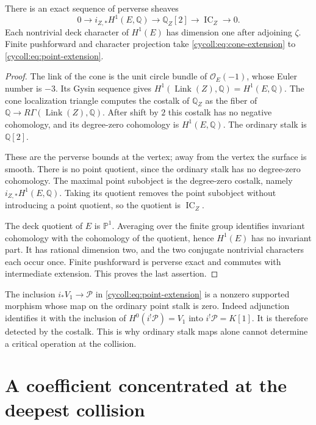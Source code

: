 \begin{proposition}\label{cycoll:prop:cone}
There is an exact sequence of perverse sheaves
\begin{equation}\label{cycoll:eq:cone-extension}
 0\longrightarrow i_{Z,*}H^1(E,\mathbb Q)
       \longrightarrow\mathbb Q_Z[2]
       \longrightarrow\operatorname{IC}_Z\longrightarrow0.
\end{equation}
Each nontrivial deck character of $H^1(E)$ has dimension
one after adjoining $\zeta$. Finite pushforward and character
projection take \eqref{cycoll:eq:cone-extension} to
\eqref{cycoll:eq:point-extension}.
\end{proposition}
\begin{proof}
The link of the cone is the unit circle bundle of
$\mathcal O_E(-1)$, whose Euler number is $-3$.
Its Gysin sequence gives
$H^1(\operatorname{Link}(Z),\mathbb Q)=H^1(E,\mathbb Q)$.
The cone localization triangle computes the costalk of
$\mathbb Q_Z$ as the fiber of
$\mathbb Q\to R\Gamma(\operatorname{Link}(Z),\mathbb Q)$.
After shift by $2$ this costalk has no negative cohomology,
and its degree-zero cohomology is $H^1(E,\mathbb Q)$.
The ordinary stalk is $\mathbb Q[2]$.

These are the perverse bounds at the vertex; away from
the vertex the surface is smooth. There is no point
quotient, since the ordinary stalk has no degree-zero
cohomology. The maximal point subobject is the degree-zero
costalk, namely $i_{Z,*}H^1(E,\mathbb Q)$.
Taking its quotient removes the point subobject without
introducing a point quotient, so the quotient is
$\operatorname{IC}_Z$.

The deck quotient of $E$ is $\mathbb P^1$. Averaging over
the finite group identifies invariant cohomology with
the cohomology of the quotient, hence $H^1(E)$ has no
invariant part. It has rational dimension two, and the
two conjugate nontrivial characters each occur once.
Finite pushforward is perverse exact and commutes with
intermediate extension. This proves the last assertion.
\end{proof}

The inclusion $i_*V_1\to\mathcal P$ in
\eqref{cycoll:eq:point-extension} is a nonzero supported
morphism whose map on the ordinary point stalk is zero.
Indeed adjunction identifies it with the inclusion of
$H^0(i^!\mathcal P)=V_1$ into $i^!\mathcal P=K[1]$.
It is therefore detected by the costalk. This is why ordinary
stalk maps alone cannot determine a critical operation
at the collision.

\section{A coefficient concentrated at the deepest collision}
\label{cycoll:sec:deep}


